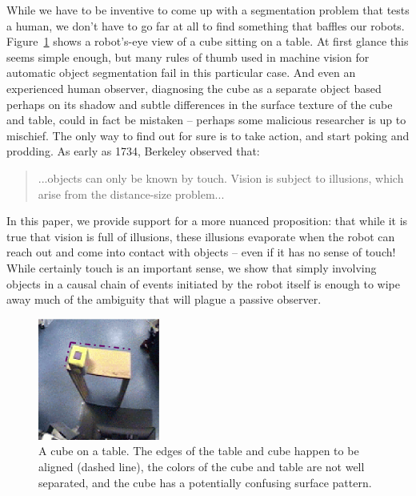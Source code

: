 While we have to be inventive to come up with a segmentation problem
that tests a human, we don't have to go far at all to find something
that baffles our robots.  Figure~\ref{fig:setup-sequence} shows a
robot's-eye view of a cube sitting on a table. At first glance this
seems simple enough, but many rules of thumb used in machine vision
for automatic object segmentation fail in this particular case.  And
even an experienced human observer, diagnosing the cube as a separate
object based perhaps on its shadow and subtle differences in the
surface texture of the cube and table, could in fact be mistaken --
perhaps some malicious researcher is up to mischief.  The only way to
find out for sure is to take action, and start poking and prodding.
As early as 1734, Berkeley observed that:
%
\begin{quote}
...objects can only be known by
touch. Vision is subject to illusions, which arise from the
distance-size problem... \cite{berkeley72new}
\end{quote}
%
In this paper, we provide support for a more nuanced proposition: that
while it is true that vision is full of illusions, these illusions
evaporate when the robot can reach out and come into contact with
objects -- even if it has no sense of touch!  While certainly touch is
an important sense, we show that simply involving objects in a causal
chain of events initiated by the robot itself is enough to wipe away much
of the ambiguity that will plague a passive observer.

%
\begin{figure}[tbh]
\begin{center}
\includegraphics[width=4cm]{setup-sequence.eps}
\caption{ 
\label{fig:setup-sequence}
%
A cube on a table. The edges of the table and cube happen to be
aligned (dashed line), the colors of the cube and table are not well
separated, and the cube has a potentially confusing surface pattern.
%
}
\end{center}
\end{figure}



